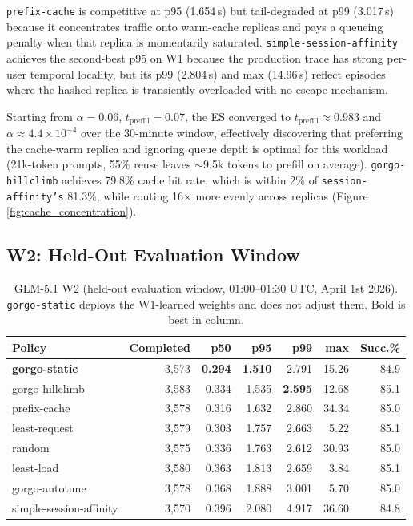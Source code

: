 \documentclass{article}
\begin{document}
\texttt{prefix-cache} is competitive at p95 (1.654\,s) but tail-degraded at p99
(3.017\,s) because it concentrates traffic onto warm-cache replicas and pays a
queueing penalty when that replica is momentarily saturated.
\texttt{simple-session-affinity} achieves the second-best p95 on W1 because the
production trace has strong per-user temporal locality, but its p99 (2.804\,s)
and max (14.96\,s) reflect episodes where the hashed replica is transiently
overloaded with no escape mechanism.

Starting from $\alpha=0.06$, $t_{\mathrm{prefill}}=0.07$, the ES converged to
$t_{\mathrm{prefill}}\approx 0.983$ and $\alpha\approx 4.4\times10^{-4}$ over
the 30-minute window, effectively discovering that preferring the cache-warm replica and ignoring queue depth is optimal for this workload (21k-token prompts, 55\% reuse leaves $\sim$9.5k
tokens to prefill on average). \texttt{gorgo-hillclimb} achieves 79.8\% cache hit rate, which is within 2\% of \texttt{session-affinity's} 81.3\%, while routing 16× more evenly across replicas (Figure \ref{fig:cache_concentration}).


\subsection{W2: Held-Out Evaluation Window}

\begin{table}[t]
\centering
\small
\caption{GLM-5.1 W2 (held-out evaluation window, 01:00--01:30 UTC, April 1st 2026).
  \texttt{gorgo-static} deploys the W1-learned weights and does not adjust them.
  Bold is best in column.}
\label{tab:w2}
\begin{tabular}{lrrrrrr}
\toprule
Policy & Completed & p50 & p95 & p99 & max & Succ.\% \\
\midrule
\textbf{gorgo-static}    & 3{,}573 & \textbf{0.294} & \textbf{1.510} & 2.791 & 15.26 & 84.9 \\
gorgo-hillclimb          & 3{,}583 & 0.334 & 1.535 & \textbf{2.595} & 12.68 & 85.1 \\
prefix-cache             & 3{,}578 & 0.316 & 1.632 & 2.860 & 34.34 & 85.0 \\
least-request            & 3{,}579 & 0.303 & 1.757 & 2.663 & 5.22  & 85.1 \\
random                   & 3{,}575 & 0.336 & 1.763 & 2.612 & 30.93 & 85.0 \\
least-load               & 3{,}580 & 0.363 & 1.813 & 2.659 & 3.84  & 85.1 \\
gorgo-autotune           & 3{,}578 & 0.368 & 1.888 & 3.001 & 5.70  & 85.0 \\
simple-session-affinity  & 3{,}570 & 0.396 & 2.080 & 4.917 & 36.60 & 84.8 \\
\bottomrule
\end{tabular}
\end{table}
\end{document}
